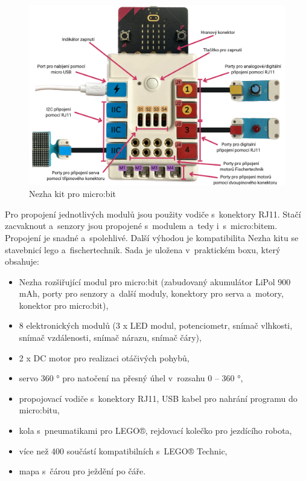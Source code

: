 \documentclass[
  digital,     %
  oneside,     %
  nosansbold,  %
  colorbold, %
  lof,         %
  nolot,         %
]{fithesis4}
\begin{document}
\begin{figure}
    \centering
    \includegraphics[width=\textwidth] {images/nezha.png}
    \caption{Nezha kit pro micro:bit}
    \label{nezha}
\end{figure}

Pro propojení jednotlivých modulů jsou použity vodiče s~konektory RJ11. Stačí zacvaknout a~senzory jsou propojené s~modulem a~tedy i~s~micro:bitem. Propojení je snadné a~spolehlivé. Další výhodou je kompatibilita Nezha kitu se stavebnicí lego a~fischertechnik. Sada je uložena v~praktickém boxu, který obsahuje:
\begin{itemize}
    \item Nezha rozšiřující modul pro micro:bit (zabudovaný akumulátor LiPol 900 mAh, porty pro senzory a~další moduly, konektory pro serva a~motory, konektor pro micro:bit),
    \item 8 elektronických modulů (3 x LED modul, potenciometr, snímač vlhkosti, snímač vzdálenosti, snímač nárazu, snímač čáry),
    \item 2 x DC motor pro realizaci otáčivých pohybů,
    \item servo 360 ° pro natočení na přesný úhel v~rozsahu 0 -- 360 °,
    \item propojovací vodiče s~konektory RJ11, USB kabel pro nahrání programu do micro:bitu,
    \item kola s~pneumatikami pro LEGO®, rejdovací kolečko pro jezdícího robota,
    \item více než 400 součástí kompatibilních s~LEGO® Technic,
    \item mapa s~čárou pro ježdění po čáře.
\end{itemize}
\end{document}
